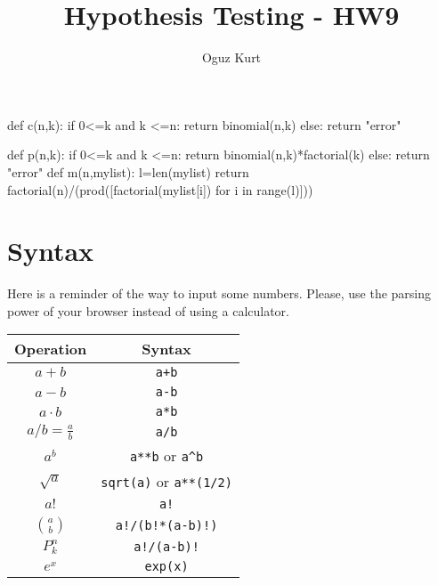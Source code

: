 \documentclass{ximera}
\title{Hypothesis Testing - HW9}
\author{Oguz Kurt}
\begin{document}
\begin{abstract}
\empty
\end{abstract}
\maketitle
\begin{sagesilent}
def c(n,k):
    if 0<=k and k <=n:
        return binomial(n,k)
    else:
        return "error"

def p(n,k):
    if 0<=k and k <=n:
        return binomial(n,k)*factorial(k)
    else:
        return "error"
def m(n,mylist):
    l=len(mylist)
    return factorial(n)/(prod([factorial(mylist[i]) for i in range(l)]))
\end{sagesilent}



\section*{Syntax}
Here is a reminder of the way to input some numbers. Please, use the parsing power of your browser instead of using a calculator.

\hspace{0.5cm}


\begin{tabular}{c|c}
Operation & Syntax  
\\
\hline
$a+b$ & {\color{red} \verb!a+b!} 
\\
\hline
$a- b$ & {\color{red} \verb!a-b!} 
\\
\hline
$a\cdot b$ & {\color{red} \verb!a*b! } 
\\
\hline
$a/b=\frac{a}{b}$ & {\color{red} \verb!a/b!}
\\
\hline
$a^b$ & {\color{red} \verb|a**b| or \verb|a^b|} 
\\
\hline
$\sqrt{a}$ & {\color{red} \verb|sqrt(a)| or \verb|a**(1/2)|} 
\\
\hline
$a!$ & {\color{red} \verb|a!|} 
\\
\hline
$\binom{a}{b}$ & {\color{red} \verb|a!/(b!*(a-b)!)|}
\\
\hline
$P_k^n$ & {\color{red} \verb|a!/(a-b)!|}
\\
\hline
$e^x$ & {\color{red} \verb|exp(x)|}
\\
\end{tabular}

\hspace{1cm}
\end{document}
